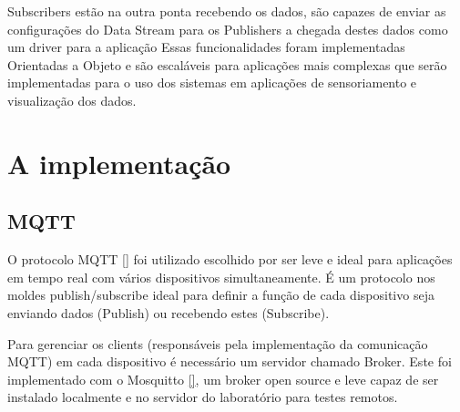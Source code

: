 Subscribers estão na outra ponta recebendo os dados, são capazes de enviar as configurações do Data Stream para os Publishers a chegada destes dados como um driver para a aplicação
Essas funcionalidades foram implementadas Orientadas a Objeto e são escaláveis para aplicações mais complexas que serão implementadas para o uso dos sistemas em aplicações de sensoriamento e visualização dos dados.

\section{A implementação}
\label{section:implementacao}



\subsection{MQTT}
\label{subsection:mqtt}

O protocolo MQTT \ref{} foi utilizado escolhido por ser leve e ideal para aplicações em tempo real com vários dispositivos simultaneamente. É um protocolo nos moldes publish/subscribe  ideal para definir a função de cada dispositivo seja enviando dados (Publish) ou recebendo estes (Subscribe).

Para gerenciar os clients (responsáveis pela implementação da comunicação MQTT) em cada dispositivo é necessário um servidor chamado Broker. Este foi implementado com o Mosquitto \ref{}, um broker open source e leve capaz de ser instalado localmente e no servidor do laboratório para testes remotos.